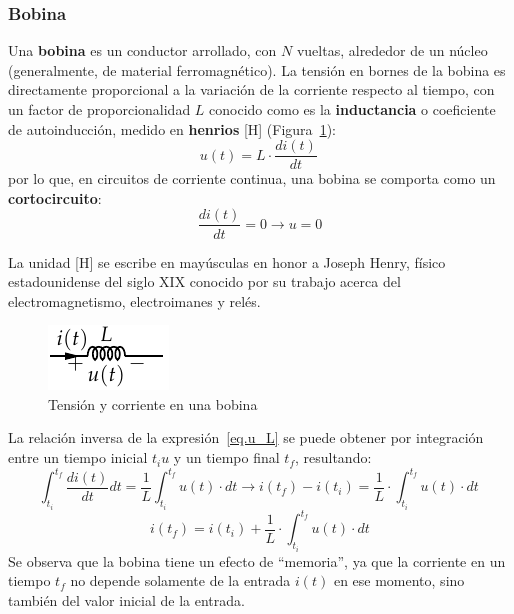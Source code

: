 \documentclass[11pt]{book} %
\begin{document}
	\subsubsection{Bobina}\label{sec.bobina}
	
	Una \textbf{bobina} es un conductor arrollado, con $N$ vueltas, alrededor de un núcleo (generalmente, de material ferromagnético). La tensión en bornes de la bobina es directamente proporcional a la variación de la corriente respecto al tiempo, con un factor de proporcionalidad $L$ conocido como es la \textbf{inductancia} o coeficiente de autoinducción, medido en \textbf{henrios} [H] (Figura~\ref{fig.bobina}):
	\begin{equation}\label{eq.u_L}
		\boxed{u(t)=L\cdot\frac{di(t)}{dt}}\,
	\end{equation}
	por lo que, en circuitos de corriente continua, una bobina se comporta como un \textbf{cortocircuito}:
	\begin{equation*}
		\dfrac{di(t)}{dt} = 0 \rightarrow u = 0
	\end{equation*}
	\begin{remark}
		La unidad [H] se escribe en mayúsculas en honor a Joseph Henry, físico estadounidense del siglo XIX conocido por su trabajo acerca del electromagnetismo, electroimanes y relés.
	\end{remark}
	\begin{figure}[htbp]
		\centering
		\includegraphics[width=0.15\linewidth]{../figs/Bobina.pdf}
		\caption{Tensión y corriente en una bobina}
		\label{fig.bobina}
	\end{figure}
	
	La relación inversa de la expresión~\eqref{eq.u_L} se puede obtener por integración entre un tiempo inicial $t_iu$ y un tiempo final $t_f$, resultando:
	\begin{equation*}
		\int_{t_i}^{t_f} \dfrac{di(t)}{dt}dt=\dfrac{1}{L}\int_{t_i}^{t_f}u(t)\cdot dt \rightarrow i(t_f)-i(t_i)=\dfrac{1}{L}\cdot\int_{t_i}^{t_f} u(t)\cdot dt\,
	\end{equation*}
	\begin{equation}
		\boxed{i(t_f)=i(t_i)+\dfrac{1}{L}\cdot\int_{t_i}^{t_f} u(t)\cdot dt}
	\end{equation}
	Se observa que la bobina tiene un efecto de ``memoria'', ya que la corriente en un tiempo $t_f$ no depende solamente de la entrada $i(t)$ en ese momento, sino también del valor inicial de la entrada.
	
\end{document}
